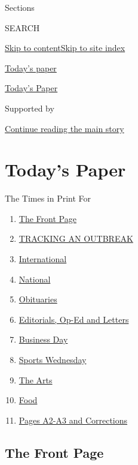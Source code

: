 Sections

SEARCH

\protect\hyperlink{site-content}{Skip to
content}\protect\hyperlink{site-index}{Skip to site index}

\href{https://www.nytimes.com/section/todayspaper}{Today's paper}

\href{https://myaccount.nytimes.com/auth/login?response_type=cookie\&client_id=vi}{}

\href{https://www.nytimes.com/section/todayspaper}{Today's Paper}

Supported by

\protect\hyperlink{after-sponsor}{Continue reading the main story}

\hypertarget{todays-paper}{%
\section{Today's Paper}\label{todays-paper}}

The Times in Print For

\begin{enumerate}
\def\labelenumi{\arabic{enumi}.}
\tightlist
\item
  \protect\hyperlink{thefrontpage}{The Front Page}
\item
  \protect\hyperlink{trackinganoutbreak}{TRACKING AN OUTBREAK}
\item
  \protect\hyperlink{international}{International}
\item
  \protect\hyperlink{national}{National}
\item
  \protect\hyperlink{obituaries}{Obituaries}
\item
  \protect\hyperlink{editorialsux2cop-edandletters}{Editorials, Op-Ed
  and Letters}
\item
  \protect\hyperlink{businessday}{Business Day}
\item
  \protect\hyperlink{sportswednesday}{Sports Wednesday}
\item
  \protect\hyperlink{thearts}{The Arts}
\item
  \protect\hyperlink{food}{Food}
\item
  \protect\hyperlink{pagesa2-a3andcorrections}{Pages A2-A3 and
  Corrections}
\end{enumerate}

\hypertarget{the-front-page}{%
\subsection{The Front Page}\label{the-front-page}}


